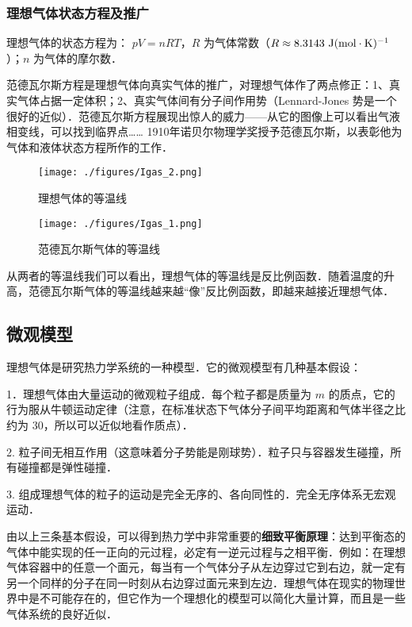 \subsubsection{理想气体状态方程及推广}
理想气体的状态方程为： $pV=nRT$，$R$ 为气体常数（$R\approx 8.3143\ \rm{J}(\rm{mol\cdot K})^{-1}$）；$n$ 为气体的摩尔数．

范德瓦尔斯方程是理想气体向真实气体的推广，对理想气体作了两点修正：1、真实气体占据一定体积；2、真实气体间有分子间作用势（Lennard-Jones 势是一个很好的近似）．范德瓦尔斯方程展现出惊人的威力——从它的图像上可以看出气液相变线，可以找到临界点…… 1910年诺贝尔物理学奖授予范德瓦尔斯，以表彰他为气体和液体状态方程所作的工作．
\begin{figure}[ht]
\centering
\texttt{[image: ./figures/Igas\_2.png]}
\caption{理想气体的等温线} \label{Igas_fig1}
\end{figure}
\begin{figure}[ht]
\centering
\texttt{[image: ./figures/Igas\_1.png]}
\caption{范德瓦尔斯气体的等温线} \label{Igas_fig2}
\end{figure}

从两者的等温线我们可以看出，理想气体的等温线是反比例函数．随着温度的升高，范德瓦尔斯气体的等温线越来越“像”反比例函数，即越来越接近理想气体．
\subsection{微观模型}

理想气体是研究热力学系统的一种模型．它的微观模型有几种基本假设：

1．理想气体由大量运动的微观粒子组成．每个粒子都是质量为 $m$ 的质点，它的行为服从牛顿运动定律（注意，在标准状态下气体分子间平均距离和气体半径之比约为 $30$，所以可以近似地看作质点）．

2. 粒子间无相互作用（这意味着分子势能是刚球势）．粒子只与容器发生碰撞，所有碰撞都是弹性碰撞．

3. 组成理想气体的粒子的运动是完全无序的、各向同性的．完全无序体系无宏观运动．

由以上三条基本假设，可以得到热力学中非常重要的\textbf{细致平衡原理}：达到平衡态的气体中能实现的任一正向的元过程，必定有一逆元过程与之相平衡．例如：在理想气体容器中的任意一个面元，每当有一个气体分子从左边穿过它到右边，就一定有另一个同样的分子在同一时刻从右边穿过面元来到左边．理想气体在现实的物理世界中是不可能存在的，但它作为一个理想化的模型可以简化大量计算，而且是一些气体系统的良好近似．